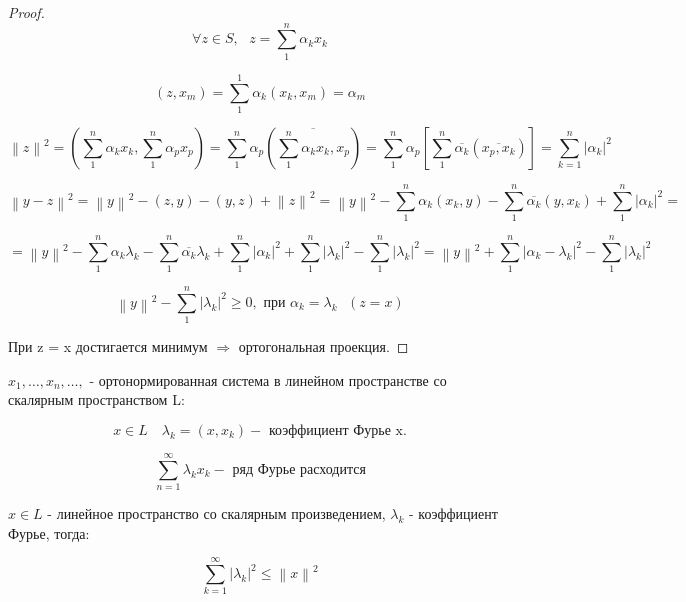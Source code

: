 \documentclass[12pt, a4paper]{report}
\begin{document}
\begin{proof}
    \[ \forall  z \in  S , \text{ }  z = \sum_{1} ^ n \alpha_k x_k  \] 

    \[  (z, x_m ) = \sum  _1 ^1 \alpha_k (x_k , x_m ) = \alpha_m \] 

    \[ \left\lVert z  \right\rVert ^2 = \left(  \sum  _ 1 ^ n \alpha_k x_k ,  \sum  _ 1 ^ n \alpha_p x_p  \right)  = \sum  _ 1 ^ n \alpha_p \left( \overline{\sum_1 ^ n \alpha_k x_k , x_p  }  \right) =\sum  _1 ^ n \alpha_p \left[ \sum  _1 ^ n \overline{\alpha_k } (\overline{x_p, x_k}  )   \right] =  \sum  _{k =1 }  ^{ n} \left\lvert  \alpha_k     \right\rvert  ^2 \]  

    \[ \left\lVert y -z  \right\rVert ^2 = \left\lVert y   \right\rVert ^2 - ( z, y ) -  ( y , z ) + \left\lVert z   \right\rVert ^2 = \left\lVert y  \right\rVert ^2 - \sum   _ 1 ^ n \alpha_k(x_k, y ) - \sum_{ 1} ^ n \overline{\alpha_k} (y, x_k ) +\sum_{ 1} ^n \left\lvert \alpha_k   \right\rvert ^2  = \]

    \[ =\left\lVert y  \right\rVert ^2 - \sum_{ 1 } ^ n \alpha_k \lambda_k - \sum_{ 1 } ^ n \overline{\alpha_k }\lambda_k +\sum_{ 1 } ^ n \left\lvert \alpha_k   \right\rvert ^2 +  \sum_{ 1 } ^ n \left\lvert \lambda_k      \right\rvert ^2- \sum_{ 1 } ^ n \left\lvert \lambda_k      \right\rvert ^2 = \left\lVert  y  \right\rVert ^2 + \sum_{ 1 } ^ n \left\lvert  \alpha_k - \lambda_k \right\rvert ^2  -\sum_{ 1 } ^ n \left\lvert \lambda_k     \right\rvert ^2       \] 

    \[ \left\lVert y  \right\rVert ^2 - \sum_{ 1 } ^ n \left\lvert \lambda_k     \right\rvert ^2 \geq 0  , \text{ при }  \alpha_k = \lambda_k \text{ } (z = x )  \] 

    При z = x  достигается минимум \( \Rightarrow   \)  ортогональная проекция.

\end{proof}

\begin{definition}
    \( x_1, \ldots, x_n, \ldots,  \)  - ортонормированная система в линейном пространстве со скалярным пространством L: 

    \[ x \in  L \quad  \lambda_k = ( x , x_k ) - \text{ коэффициент Фурье x.}  \] 

    \[ \sum_{ n= 1 } ^{\infty } \lambda_k x_k - \text{ ряд Фурье расходится}  \] 


\end{definition}

\begin{theorem}    
    \( x \in  L  \)  - линейное пространство со скалярным произведением, \( \lambda_k  \)  - коэффициент Фурье, тогда:

    \[ \sum_{k =1}^{\infty  } \left\lvert  \lambda_k     \right\rvert ^2 \le  \left\lVert x  \right\rVert ^2  \] 


\end{theorem}
\end{document}
